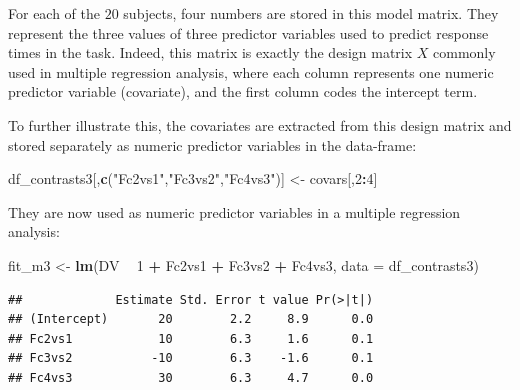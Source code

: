 \documentclass[12pt,]{krantz}
\newenvironment{Shaded}{\begin{snugshade}}{\end{snugshade}}
\newcommand{\DataTypeTok}[1]{\textcolor[rgb]{0.13,0.29,0.53}{#1}}
\newcommand{\DecValTok}[1]{\textcolor[rgb]{0.00,0.00,0.81}{#1}}
\newcommand{\KeywordTok}[1]{\textcolor[rgb]{0.13,0.29,0.53}{\textbf{#1}}}
\newcommand{\NormalTok}[1]{#1}
\newcommand{\OperatorTok}[1]{\textcolor[rgb]{0.81,0.36,0.00}{\textbf{#1}}}
\newcommand{\StringTok}[1]{\textcolor[rgb]{0.31,0.60,0.02}{#1}}
\begin{document}
For each of the \(20\) subjects, four numbers are stored in this model matrix. They represent the three values of three predictor variables used to predict response times in the task. Indeed, this matrix is exactly the design matrix \(X\) commonly used in multiple regression analysis, where each column represents one numeric predictor variable (covariate), and the first column codes the intercept term.

To further illustrate this, the covariates are extracted from this design matrix and stored separately as numeric predictor variables in the data-frame:

\begin{Shaded}
\begin{Highlighting}[]
\NormalTok{df_contrasts3[,}\KeywordTok{c}\NormalTok{(}\StringTok{"Fc2vs1"}\NormalTok{,}\StringTok{"Fc3vs2"}\NormalTok{,}\StringTok{"Fc4vs3"}\NormalTok{)] <-}\StringTok{ }\NormalTok{covars[,}\DecValTok{2}\OperatorTok{:}\DecValTok{4}\NormalTok{]}
\end{Highlighting}
\end{Shaded}

They are now used as numeric predictor variables in a multiple regression analysis:

\begin{Shaded}
\begin{Highlighting}[]
\NormalTok{fit_m3 <-}\StringTok{ }\KeywordTok{lm}\NormalTok{(DV }\OperatorTok{~}\StringTok{ }\DecValTok{1} \OperatorTok{+}\StringTok{ }\NormalTok{Fc2vs1 }\OperatorTok{+}\StringTok{ }\NormalTok{Fc3vs2 }\OperatorTok{+}\StringTok{ }\NormalTok{Fc4vs3,}
                 \DataTypeTok{data =}\NormalTok{ df_contrasts3) }
\end{Highlighting}
\end{Shaded}

\begin{Shaded}
\end{Shaded}

\begin{verbatim}
##             Estimate Std. Error t value Pr(>|t|)
## (Intercept)       20        2.2     8.9      0.0
## Fc2vs1            10        6.3     1.6      0.1
## Fc3vs2           -10        6.3    -1.6      0.1
## Fc4vs3            30        6.3     4.7      0.0
\end{verbatim}
\end{document}
